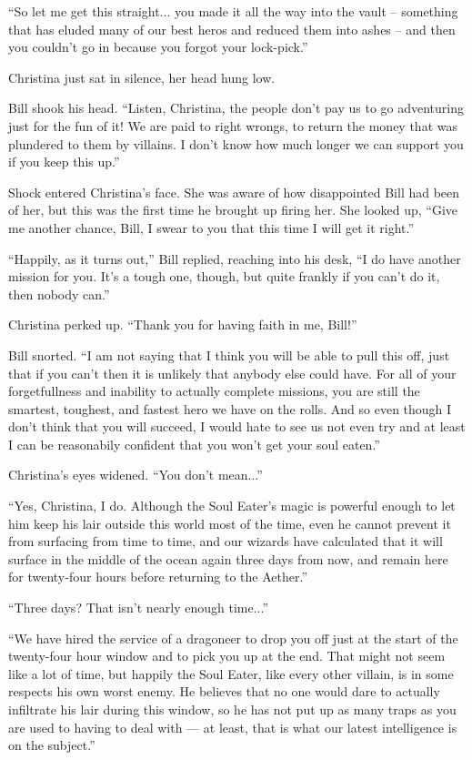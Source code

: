 \documentclass[showtrims,b6paper,draft,10pt]{memoir}
\begin{document}
``So let me get this straight... you made it all the way into the vault -- something that has eluded many of our best heros and reduced them into ashes -- and then you couldn't go in because you forgot your lock-pick.''

Christina just sat in silence, her head hung low.

Bill shook his head.  ``Listen, Christina, the people don't pay us to go adventuring just for the fun of it!  We are paid to right wrongs, to return the money that was plundered to them by villains.  I don't know how much longer we can support you if you keep this up.''

Shock entered Christina's face.  She was aware of how disappointed Bill had been of her, but this was the first time he brought up firing her.  She looked up,  ``Give me another chance, Bill, I swear to you that this time I will get it right.''

``Happily, as it turns out,'' Bill replied, reaching into his desk, ``I do have another mission for you.  It's a tough one, though, but quite frankly if you can't do it, then nobody can.''

Christina perked up.  ``Thank you for having faith in me, Bill!''

Bill snorted.  ``I am not saying that I think you will be able to pull this off, just that if you can't then it is unlikely that anybody else could have.  For all of your forgetfullness and inability to actually complete missions, you are still the smartest, toughest, and fastest hero we have on the rolls.  And so even though I don't think that you will succeed, I would hate to see us not even try and at least I can be reasonabily confident that you won't get your soul eaten.''

Christina's eyes widened.  ``You don't mean...''

``Yes, Christina, I do.  Although the Soul Eater's magic is powerful enough to let him keep his lair outside this world most of the time, even he cannot prevent it from surfacing from time to time, and our wizards have calculated that it will surface in the middle of the ocean again three days from now, and remain here for twenty-four hours before returning to the Aether.''

``Three days?  That isn't nearly enough time...''

``We have hired the service of a dragoneer to drop you off just at the start of the twenty-four hour window and to pick you up at the end.  That might not seem like a lot of time, but happily the Soul Eater, like every other villain, is in some respects his own worst enemy.  He believes that no one would dare to actually infiltrate his lair during this window, so he has not put up as many traps as you are used to having to deal with --- at least, that is what our latest intelligence is on the subject.''
\end{document}
